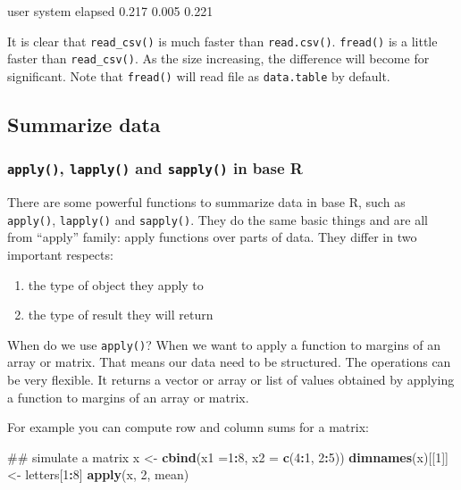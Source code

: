 \documentclass[12pt,]{krantz}
\newenvironment{Shaded}{\begin{snugshade}}{\end{snugshade}}
\newcommand{\KeywordTok}[1]{\textcolor[rgb]{0.13,0.29,0.53}{\textbf{#1}}}
\newcommand{\DataTypeTok}[1]{\textcolor[rgb]{0.13,0.29,0.53}{#1}}
\newcommand{\DecValTok}[1]{\textcolor[rgb]{0.00,0.00,0.81}{#1}}
\newcommand{\StringTok}[1]{\textcolor[rgb]{0.31,0.60,0.02}{#1}}
\newcommand{\OperatorTok}[1]{\textcolor[rgb]{0.81,0.36,0.00}{\textbf{#1}}}
\newcommand{\NormalTok}[1]{#1}
\providecommand{\tightlist}{%
  \setlength{\itemsep}{0pt}\setlength{\parskip}{0pt}}
\theoremstyle{definition}
\theoremstyle{definition}
\theoremstyle{definition}
\theoremstyle{remark}
\begin{document}
\begin{Shaded}
\begin{Highlighting}[]
\NormalTok{   user  system elapsed }
\NormalTok{  0.217   0.005   0.221 }
\end{Highlighting}
\end{Shaded}

It is clear that \texttt{read\_csv()} is much faster than
\texttt{read.csv()}. \texttt{fread()} is a little faster than
\texttt{read\_csv()}. As the size increasing, the difference will become
for significant. Note that \texttt{fread()} will read file as
\texttt{data.table} by default.

\subsection{Summarize data}\label{summarize-data}

\subsubsection{\texorpdfstring{\texttt{apply()}, \texttt{lapply()} and
\texttt{sapply()} in base
R}{apply(), lapply() and sapply() in base R}}\label{apply-lapply-and-sapply-in-base-r}

There are some powerful functions to summarize data in base R, such as
\texttt{apply()}, \texttt{lapply()} and \texttt{sapply()}. They do the
same basic things and are all from ``apply'' family: apply functions
over parts of data. They differ in two important respects:

\begin{enumerate}
\def\labelenumi{\arabic{enumi}.}
\tightlist
\item
  the type of object they apply to
\item
  the type of result they will return
\end{enumerate}

When do we use \texttt{apply()}? When we want to apply a function to
margins of an array or matrix. That means our data need to be
structured. The operations can be very flexible. It returns a vector or
array or list of values obtained by applying a function to margins of an
array or matrix.

For example you can compute row and column sums for a matrix:

\begin{Shaded}
\begin{Highlighting}[]
\NormalTok{## simulate a matrix}
\NormalTok{x <-}\StringTok{ }\KeywordTok{cbind}\NormalTok{(}\DataTypeTok{x1 =}\DecValTok{1}\OperatorTok{:}\DecValTok{8}\NormalTok{, }\DataTypeTok{x2 =} \KeywordTok{c}\NormalTok{(}\DecValTok{4}\OperatorTok{:}\DecValTok{1}\NormalTok{, }\DecValTok{2}\OperatorTok{:}\DecValTok{5}\NormalTok{))}
\KeywordTok{dimnames}\NormalTok{(x)[[}\DecValTok{1}\NormalTok{]] <-}\StringTok{ }\NormalTok{letters[}\DecValTok{1}\OperatorTok{:}\DecValTok{8}\NormalTok{]}
\KeywordTok{apply}\NormalTok{(x, }\DecValTok{2}\NormalTok{, mean)}
\end{Highlighting}
\end{Shaded}
\end{document}
